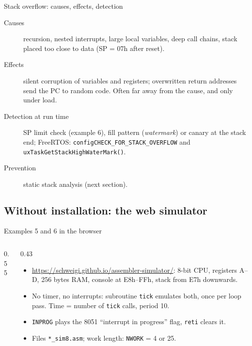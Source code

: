 
\begin{frame}{Stack overflow: causes, effects, detection}
  \begin{description}
    \item[Causes] recursion, nested interrupts, large local variables, deep call chains, stack placed too close to data (SP = 07h after reset).
    \item[Effects] silent corruption of variables and registers; overwritten return addresses send the PC to random code. Often far away from the cause, and only under load.
    \item[Detection at run time] SP limit check (example 6), fill pattern (\emph{watermark}) or canary at the stack end; FreeRTOS: \texttt{configCHECK\_FOR\_STACK\_OVERFLOW} and \texttt{uxTaskGetStackHighWaterMark()}.
    \item[Prevention] static stack analysis (next section).
  \end{description}
\end{frame}

\subsection{Without installation: the web simulator}
\begin{frame}[fragile]{Examples 5 and 6 in the browser}
  \begin{columns}[T]
    \begin{column}{0.55\textwidth}

    \end{column}
    \begin{column}{0.43\textwidth}
      \small
      \begin{itemize}
        \item \url{https://schweigi.github.io/assembler-simulator/}: 8-bit CPU, registers A--D, 256 bytes RAM, console at E8h--FFh, stack from E7h downwards.
        \item No timer, no interrupts: subroutine \texttt{tick} emulates both, once per loop pass. Time = number of \texttt{tick} calls, period 10.
        \item \texttt{INPROG} plays the 8051 ``interrupt in progress'' flag, \texttt{reti} clears it.
        \item Files \texttt{*\_sim8.asm}; work length: \texttt{NWORK} = 4 or 25.
      \end{itemize}
    \end{column}
  \end{columns}
\end{frame}

